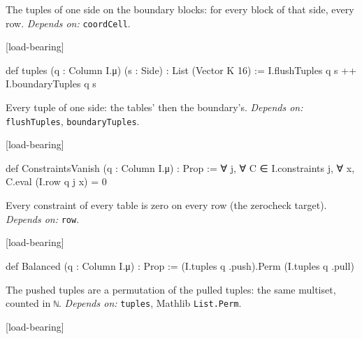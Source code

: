 
The tuples of one side on the boundary blocks: for every block of that side, every row. \emph{Depends on:} \texttt{coordCell}.

\par\medskip\noindent\textbf{}\hfill\textsf{\small [load-bearing]}\par\nopagebreak

\begin{leancode}
def tuples (q : Column I.μ) (s : Side) : List (Vector K 16) :=
  I.flushTuples q s ++ I.boundaryTuples q s
\end{leancode}


Every tuple of one side: the tables' then the boundary's. \emph{Depends on:} \texttt{flushTuples}, \texttt{boundaryTuples}.

\par\medskip\noindent\textbf{}\hfill\textsf{\small [load-bearing]}\par\nopagebreak

\begin{leancode}
def ConstraintsVanish (q : Column I.μ) : Prop :=
  ∀ j, ∀ C ∈ I.constraints j, ∀ x, C.eval (I.row q j x) = 0
\end{leancode}


Every constraint of every table is zero on every row (the zerocheck target). \emph{Depends on:} \texttt{row}.

\par\medskip\noindent\textbf{}\hfill\textsf{\small [load-bearing]}\par\nopagebreak

\begin{leancode}
def Balanced (q : Column I.μ) : Prop := (I.tuples q .push).Perm (I.tuples q .pull)
\end{leancode}


The pushed tuples are a permutation of the pulled tuples: the same multiset, counted in \texttt{ℕ}. \emph{Depends on:} \texttt{tuples}, Mathlib \texttt{List.\allowbreak{}Perm}.

\par\medskip\noindent\textbf{}\hfill\textsf{\small [load-bearing]}\par\nopagebreak

